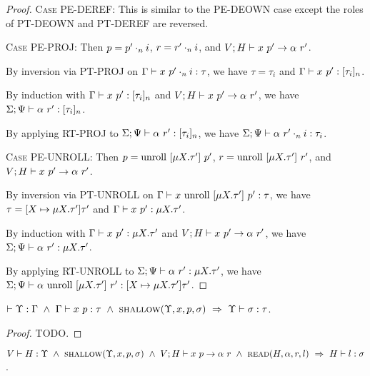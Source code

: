 \documentclass{article}
\begin{document}
\begin{proof}
    \textsc{Case PE-DEREF}: 
      This is similar to the \textsc{PE-DEOWN} case except the roles of
      \textsc{PT-DEOWN} and \textsc{PT-DEREF} are reversed.

  \textsc{Case PE-PROJ}:
    Then $p = {p'}\cdot_{n} {i}$, $r = {r'}\cdot_{n} {i}$, and ${{V};{H}} \vdash {{x}\ {p'}} \rightarrow {{\alpha}\ {r'}}$.

    By inversion via \textsc{PT-PROJ} on ${{\Gamma}} \vdash {{x}\ {{p'}\cdot_{n} {i}}} : {{\tau}}$,
    we have $\tau = \tau_i$ and ${{\Gamma}} \vdash {{x}\ {p'}} : {{[ {\tau_i} ]_{n}}}$.

    By induction with ${{\Gamma}} \vdash {{x}\ {p'}} : {{[ {\tau_i} ]_{n}}}$
    and ${{V};{H}} \vdash {{x}\ {p'}} \rightarrow {{\alpha}\ {r'}}$,
    we have ${{{\Sigma}} ;{{\Psi}}} \vdash {{{\alpha}\ {r'}}} : {{{[ {\tau_i} ]_{n}}}}$.

    By applying \textsc{RT-PROJ} to ${{{\Sigma}} ;{{\Psi}}} \vdash {{{\alpha}\ {r'}}} : {{{[ {\tau_i} ]_{n}}}}$,
    we have ${{{\Sigma}} ;{{\Psi}}} \vdash {{{\alpha}\ {{r'}\cdot_{n} {i}}}} : {{{\tau_i}}}$.

  \textsc{Case PE-UNROLL}:
    Then $p = \textrm{unroll}\ [{\mu {X}.{\tau'}}]\ {p'}$, $r = \textrm{unroll}\ [{\mu {X}.{\tau'}}]\ {r'}$,
    and ${{V};{H}} \vdash {{x}\ {p'}} \rightarrow {{\alpha}\ {r'}}$.

    By inversion via \textsc{PT-UNROLL} on ${{\Gamma}} \vdash {{x}\ {\textrm{unroll}\ [{\mu {X}.{\tau'}}]\ {p'}}} : {{\tau}}$,
    we have $\tau = [{X} \mapsto {\mu {X}.{\tau'}}]{\tau'}$ and ${{\Gamma}} \vdash {{x}\ {p'}} : {{\mu {X}.{\tau'}}}$.

    By induction with ${{\Gamma}} \vdash {{x}\ {p'}} : {{\mu {X}.{\tau'}}}$ and ${{V};{H}} \vdash {{x}\ {p'}} \rightarrow {{\alpha}\ {r'}}$,
    we have ${{{\Sigma}} ;{{\Psi}}} \vdash {{{\alpha}\ {r'}}} : {{{\mu {X}.{\tau'}}}}$.

    By applying \textsc{RT-UNROLL} to ${{{\Sigma}} ;{{\Psi}}} \vdash {{{\alpha}\ {r'}}} : {{{\mu {X}.{\tau'}}}}$,
    we have
    ${{{\Sigma}} ;{{\Psi}}} \vdash {{{\alpha}\ {\textrm{unroll}\ [{\mu {X}.{\tau'}}]\ {r'}}}} : {{{[{X} \mapsto {\mu {X}.{\tau'}}]{\tau'}}}}$.
\end{proof}

\begin{lem}
  $\YWF{\Upsilon}{\Gamma}\ \land\ \PType{\Gamma}{x}{p}{\tau}\ \land\
   \Shallow{\Upsilon}{x}{p}{\sigma}\ \Rightarrow\ \Type{\Upsilon}{\sigma}{\tau}$.
\end{lem}

\begin{proof}
  TODO.
\end{proof}

\begin{lem}
  $\Type{V}{H}{\Upsilon}\ \land\ \Shallow{\Upsilon}{x}{p}{\sigma}\ \land\
   \PEval{V}{H}{x}{p}{\alpha}{r}\ \land\ \Read{H}{\alpha}{r}{l}\ \Rightarrow\
   \Type{H}{l}{\sigma}$.
\end{lem}
\end{document}
